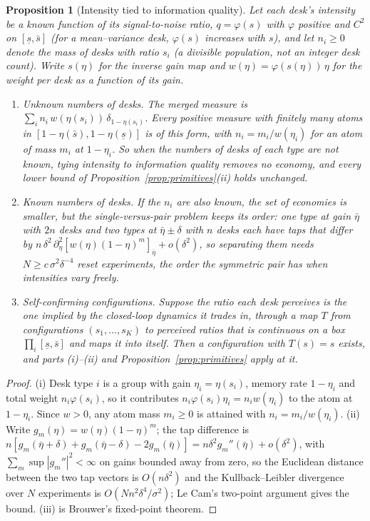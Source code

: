 \documentclass[12pt]{article}
\newtheorem{proposition}[theorem]{Proposition}
\theoremstyle{definition}
\theoremstyle{remark}
\begin{document}
\begin{proposition}[Intensity tied to information quality]\label{prop:tied}
Let each desk's intensity be a known function of its signal-to-noise ratio, $q=\varphi(s)$ with $\varphi$ positive and $C^2$ on $[\underline s,\bar s]$ (for a mean--variance desk, $\varphi(s)$ increases with $s$), and let $n_i\ge0$ denote the mass of desks with ratio $s_i$ (a divisible population, not an integer desk count). Write $s(\eta)$ for the inverse gain map and $w(\eta)=\varphi(s(\eta))\,\eta$ for the weight per desk as a function of its gain.
\begin{enumerate}[label=(\roman*)]
\item \emph{Unknown numbers of desks.} The merged measure is $\sum_in_i\,w(\eta(s_i))\,\delta_{1-\eta(s_i)}$. Every positive measure with finitely many atoms in $[1-\eta(\bar s),1-\eta(\underline s)]$ is of this form, with $n_i=m_i/w(\eta_i)$ for an atom of mass $m_i$ at $1-\eta_i$. So when the numbers of desks of each type are not known, tying intensity to information quality removes no economy, and every lower bound of Proposition~\ref{prop:primitives}(ii) holds unchanged.
\item \emph{Known numbers of desks.} If the $n_i$ are also known, the set of economies is smaller, but the single-versus-pair problem keeps its order: one type at gain $\bar\eta$ with $2n$ desks and two types at $\bar\eta\pm\delta$ with $n$ desks each have taps that differ by $n\,\delta^2\,\partial_\eta^2[w(\eta)(1-\eta)^m]_{\bar\eta}+o(\delta^2)$, so separating them needs $N\ge c\,\sigma^2\delta^{-4}$ reset experiments, the order the symmetric pair has when intensities vary freely.
\item \emph{Self-confirming configurations.} Suppose the ratio each desk perceives is the one implied by the closed-loop dynamics it trades in, through a map $T$ from configurations $(s_1,\dots,s_K)$ to perceived ratios that is continuous on a box $\prod_i[\underline s,\bar s]$ and maps it into itself. Then a configuration with $T(s)=s$ exists, and parts (i)--(ii) and Proposition~\ref{prop:primitives} apply at it.
\end{enumerate}
\end{proposition}

\begin{proof}
(i) Desk type $i$ is a group with gain $\eta_i=\eta(s_i)$, memory rate $1-\eta_i$ and total weight $n_i\varphi(s_i)$, so it contributes $n_i\varphi(s_i)\eta_i=n_iw(\eta_i)$ to the atom at $1-\eta_i$. Since $w>0$, any atom mass $m_i\ge0$ is attained with $n_i=m_i/w(\eta_i)$. (ii) Write $g_m(\eta)=w(\eta)(1-\eta)^m$; the tap difference is $n[g_m(\bar\eta+\delta)+g_m(\bar\eta-\delta)-2g_m(\bar\eta)]=n\delta^2g_m''(\bar\eta)+o(\delta^2)$, with $\sum_m\sup|g_m''|^2<\infty$ on gains bounded away from zero, so the Euclidean distance between the two tap vectors is $O(n\delta^2)$ and the Kullback--Leibler divergence over $N$ experiments is $O(Nn^2\delta^4/\sigma^2)$; Le Cam's two-point argument gives the bound. (iii) is Brouwer's fixed-point theorem.
\end{proof}
\end{document}
